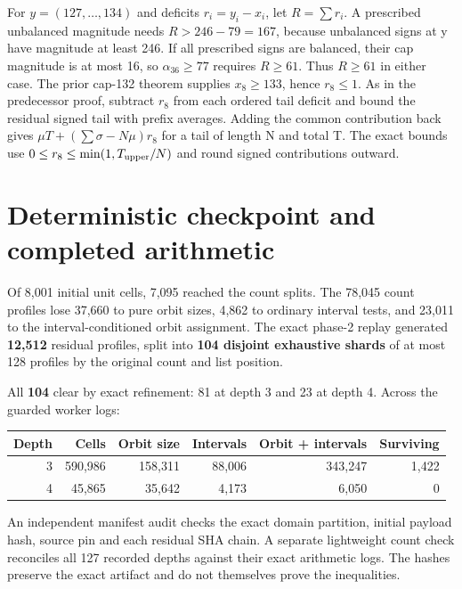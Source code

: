 \documentclass[11pt,letterpaper]{article}
\begin{document}
For \(y=(127,\dots,134)\) and deficits \(r_i=y_i-x_i\), let
\(R=\sum r_i\). A prescribed unbalanced magnitude needs
\(R>246-79=167\), because unbalanced signs at y have magnitude at least
246. If all prescribed signs are balanced, their cap magnitude is at
most 16, so \(\alpha_{36}\ge77\) requires \(R\ge61\). Thus \(R\ge61\) in
either case. The prior cap-132 theorem supplies \(x_8\ge133\), hence
\textbf{\(r_8\le1\)}. As in the predecessor proof, subtract \(r_8\) from
each ordered tail deficit and bound the residual signed tail with prefix
averages. Adding the common contribution back gives
\(\mu T + (\sum\sigma-N\mu)r_8\) for a tail of length N and total T. The
exact bounds use \(0\le r_8\le\min(1,T_{\rm upper}/N)\) and round signed
contributions outward.

\section{Deterministic checkpoint and completed
arithmetic}\label{deterministic-checkpoint-and-completed-arithmetic}

Of 8,001 initial unit cells, 7,095 reached the count splits. The 78,045
count profiles lose 37,660 to pure orbit sizes, 4,862 to ordinary
interval tests, and 23,011 to the interval-conditioned orbit assignment.
The exact phase-2 replay generated \textbf{12,512} residual profiles,
split into \textbf{104 disjoint exhaustive shards} of at most 128
profiles by the original count and list position.

All \textbf{104} clear by exact refinement: 81 at depth 3 and 23 at
depth 4. Across the guarded worker logs:

\begin{center}
\small
\begin{tabular}{rrrrrr}
\toprule
Depth & Cells & Orbit size & Intervals & Orbit + intervals & Surviving \\
\midrule
3 & 590,986 & 158,311 & 88,006 & 343,247 & 1,422 \\
4 & 45,865 & 35,642 & 4,173 & 6,050 & 0 \\
\bottomrule
\end{tabular}
\end{center}

An independent manifest audit checks the exact domain partition, initial
payload hash, source pin and each residual SHA chain. A separate
lightweight count check reconciles all 127 recorded depths against their
exact arithmetic logs. The hashes preserve the exact artifact and do not
themselves prove the inequalities.
\end{document}

